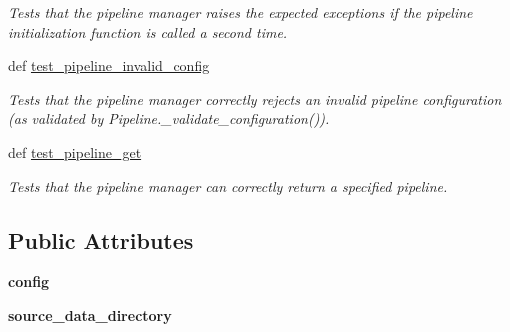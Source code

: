 \begin{DoxyCompactItemize}
\begin{DoxyCompactList}\small\item\em Tests that the pipeline manager raises the expected exceptions if the pipeline initialization function is called a second time. \end{DoxyCompactList}\item 
def \hyperlink{classhwm_1_1hardware_1_1pipelines_1_1tests_1_1test__pipeline__manager_1_1_test_pipeline_manager_a1f51d3e12b2c7028d2bb7eaf8fc30024}{test\-\_\-pipeline\-\_\-invalid\-\_\-config}
\begin{DoxyCompactList}\small\item\em Tests that the pipeline manager correctly rejects an invalid pipeline configuration (as validated by Pipeline.\-\_\-validate\-\_\-configuration()). \end{DoxyCompactList}\item 
\hypertarget{classhwm_1_1hardware_1_1pipelines_1_1tests_1_1test__pipeline__manager_1_1_test_pipeline_manager_afc95e79fcb438a9a1bbbc1987632db6c}{def \hyperlink{classhwm_1_1hardware_1_1pipelines_1_1tests_1_1test__pipeline__manager_1_1_test_pipeline_manager_afc95e79fcb438a9a1bbbc1987632db6c}{test\-\_\-pipeline\-\_\-get}}\label{classhwm_1_1hardware_1_1pipelines_1_1tests_1_1test__pipeline__manager_1_1_test_pipeline_manager_afc95e79fcb438a9a1bbbc1987632db6c}

\begin{DoxyCompactList}\small\item\em Tests that the pipeline manager can correctly return a specified pipeline. \end{DoxyCompactList}\end{DoxyCompactItemize}
\subsection*{Public Attributes}
\begin{DoxyCompactItemize}
\item 
\hypertarget{classhwm_1_1hardware_1_1pipelines_1_1tests_1_1test__pipeline__manager_1_1_test_pipeline_manager_ad92a77f755c8cebb0389690a65cb1f93}{{\bfseries config}}\label{classhwm_1_1hardware_1_1pipelines_1_1tests_1_1test__pipeline__manager_1_1_test_pipeline_manager_ad92a77f755c8cebb0389690a65cb1f93}

\item 
\hypertarget{classhwm_1_1hardware_1_1pipelines_1_1tests_1_1test__pipeline__manager_1_1_test_pipeline_manager_afd711b88d77f50caea5c8503435451fd}{{\bfseries source\-\_\-data\-\_\-directory}}\label{classhwm_1_1hardware_1_1pipelines_1_1tests_1_1test__pipeline__manager_1_1_test_pipeline_manager_afd711b88d77f50caea5c8503435451fd}

\end{DoxyCompactItemize}


